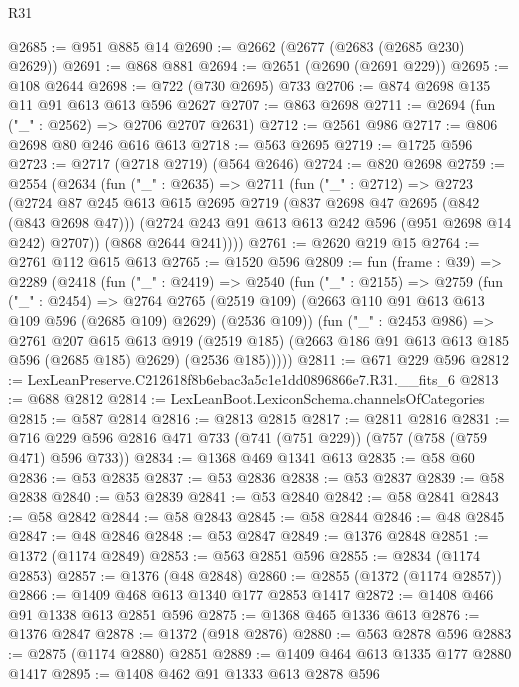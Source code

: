 \begin{lexlean}{R31}
\begin{coremodule}
@2685 := @951 @885 @14
@2690 := @2662 (@2677 (@2683 (@2685 @230) @2629))
@2691 := @868 @881
@2694 := @2651 (@2690 (@2691 @229))
@2695 := @108 @2644
@2698 := @722 (@730 @2695) @733
@2706 := @874 @2698 @135 @11 @91 @613 @613 @596 @2627
@2707 := @863 @2698
@2711 := @2694 (fun ("_" : @2562) => @2706 @2707 @2631)
@2712 := @2561 @986
@2717 := @806 @2698 @80 @246 @616 @613
@2718 := @563 @2695
@2719 := @1725 @596
@2723 := @2717 (@2718 @2719) (@564 @2646)
@2724 := @820 @2698
@2759 := @2554
    (@2634
      (fun ("_" : @2635) =>
      @2711
        (fun ("_" : @2712) =>
        @2723
          (@2724
            @87
            @245
            @613
            @615
            @2695
            @2719
            (@837 @2698 @47 @2695 (@842 (@843 @2698 @47)))
            (@2724 @243 @91 @613 @613 @242 @596 (@951 @2698 @14 @242) @2707))
          (@868 @2644 @241))))
@2761 := @2620 @219 @15
@2764 := @2761 @112 @615 @613
@2765 := @1520 @596
@2809 := fun (frame : @39) =>
  @2289
    (@2418
      (fun ("_" : @2419) =>
      @2540
        (fun ("_" : @2155) =>
        @2759
          (fun ("_" : @2454) =>
          @2764
            @2765
            (@2519 @109)
            (@2663 @110 @91 @613 @613 @109 @596 (@2685 @109) @2629)
            (@2536 @109))
          (fun ("_" : @2453 @986) =>
          @2761
            @207
            @615
            @613
            @919
            (@2519 @185)
            (@2663 @186 @91 @613 @613 @185 @596 (@2685 @185) @2629)
            (@2536 @185)))))
@2811 := @671 @229 @596
@2812 := LexLeanPreserve.C212618f8b6ebac3a5c1e1dd0896866e7.R31.__fits_6
@2813 := @688 @2812
@2814 := LexLeanBoot.LexiconSchema.channelsOfCategories
@2815 := @587 @2814
@2816 := @2813 @2815
@2817 := @2811 @2816
@2831 := @716 @229 @596 @2816 @471 @733 (@741 (@751 @229)) (@757 (@758 (@759 @471) @596 @733))
@2834 := @1368 @469 @1341 @613
@2835 := @58 @60
@2836 := @53 @2835
@2837 := @53 @2836
@2838 := @53 @2837
@2839 := @58 @2838
@2840 := @53 @2839
@2841 := @53 @2840
@2842 := @58 @2841
@2843 := @58 @2842
@2844 := @58 @2843
@2845 := @58 @2844
@2846 := @48 @2845
@2847 := @48 @2846
@2848 := @53 @2847
@2849 := @1376 @2848
@2851 := @1372 (@1174 @2849)
@2853 := @563 @2851 @596
@2855 := @2834 (@1174 @2853)
@2857 := @1376 (@48 @2848)
@2860 := @2855 (@1372 (@1174 @2857))
@2866 := @1409 @468 @613 @1340 @177 @2853 @1417
@2872 := @1408 @466 @91 @1338 @613 @2851 @596
@2875 := @1368 @465 @1336 @613
@2876 := @1376 @2847
@2878 := @1372 (@918 @2876)
@2880 := @563 @2878 @596
@2883 := @2875 (@1174 @2880) @2851
@2889 := @1409 @464 @613 @1335 @177 @2880 @1417
@2895 := @1408 @462 @91 @1333 @613 @2878 @596

\end{coremodule}
\end{lexlean}
